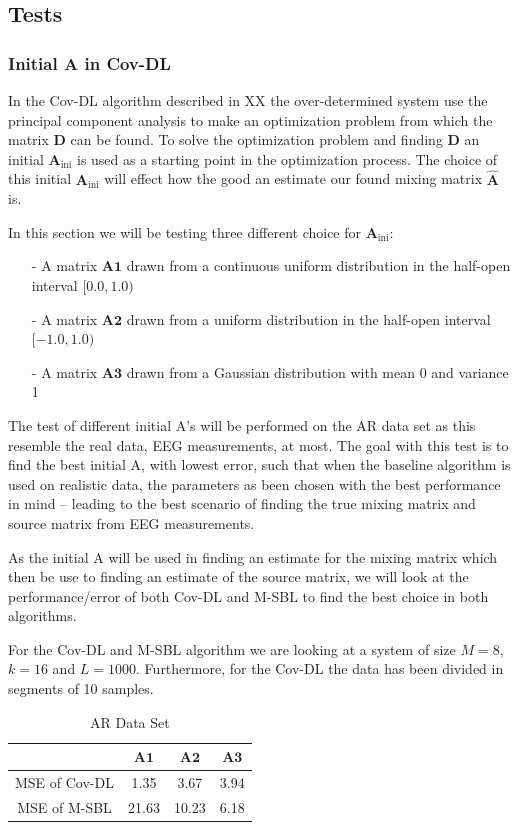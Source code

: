 \subsection{Tests}

\subsubsection{Initial A in Cov-DL}
In the Cov-DL algorithm described in XX the over-determined system use the principal component analysis to make an optimization problem from which the matrix $\mathbf{D}$ can be found. To solve the optimization problem and finding $\mathbf{D}$ an initial $\mathbf{A}_{\text{ini}}$ is used as a starting point in the optimization process. The choice of this initial $\mathbf{A}_{\text{ini}}$ will effect how the good an estimate our found mixing matrix $\hat{\mathbf{A}}$ is.

In this section we will be testing three different choice for $\mathbf{A}_{\text{ini}}$:
\begin{itemize}
\item[-] A matrix $\mathbf{A1}$ drawn from a continuous uniform distribution in the half-open interval $[0.0, 1.0)$
\item[-] A matrix $\mathbf{A2}$ drawn from a uniform distribution in the half-open interval $[-1.0, 1.0)$
\item[-] A matrix $\mathbf{A3}$ drawn from a Gaussian distribution with mean 0 and variance 1
\end{itemize}
The test of different initial A's will be performed on the AR data set as this resemble the real data, EEG measurements, at most. The goal with this test is to find the best initial A, with lowest error, such that when the baseline algorithm is used on realistic data, the parameters as been chosen with the best performance in mind -- leading to the best scenario of finding the true mixing matrix and source matrix from EEG measurements.

As the initial A will be used in finding an estimate for the mixing matrix which then be use to finding an estimate of the source matrix, we will look at the performance/error of both Cov-DL and M-SBL to find the best choice in both algorithms.

For the Cov-DL and M-SBL algorithm we are looking at a system of size $M = 8$, $k = 16$ and $L = 1000$. Furthermore, for the Cov-DL the data has been divided in segments of 10 samples.
\begin{table}[H]
\centering
\begin{tabular}{|c|c|c|c|}
\hline 
 & $\mathbf{A1}$ & $\mathbf{A2}$ & $\mathbf{A3}$ \\ 
\hline 
MSE of Cov-DL & 1.35 & 3.67 & 3.94 \\ 
\hline 
MSE of M-SBL & 21.63 & 10.23 & 6.18 \\ 
\hline
\end{tabular} 
\caption{AR Data Set}
\end{table}

